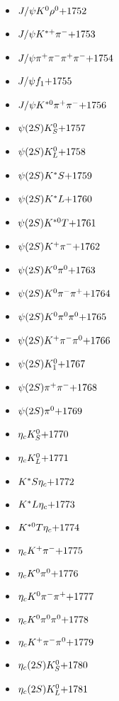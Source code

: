 \begin{multicols}{3}
\begin{itemize}
 \item $ J/\psi K^{0} \rho^{0} \hfill{+1752}$
 \item $ J/\psi K^{*+} \pi^{-} \hfill{+1753}$
 \item $ J/\psi \pi^{+} \pi^{-} \pi^{+} \pi^{-} \hfill{+1754}$
 \item $ J/\psi f_{1} \hfill{+1755}$
 \item $ J/\psi K^{*0} \pi^{+} \pi^{-} \hfill{+1756}$
 \item $ \psi(2S) K_{S}^{0} \hfill{+1757}$
 \item $ \psi(2S) K_{L}^{0} \hfill{+1758}$
 \item $ \psi(2S) K^{*}S \hfill{+1759}$
 \item $ \psi(2S) K^{*}L \hfill{+1760}$
 \item $ \psi(2S) K^{*0}T \hfill{+1761}$
 \item $ \psi(2S) K^{+} \pi^{-} \hfill{+1762}$
 \item $ \psi(2S) K^{0} \pi^{0} \hfill{+1763}$
 \item $ \psi(2S) K^{0} \pi^{-} \pi^{+} \hfill{+1764}$
 \item $ \psi(2S) K^{0} \pi^{0} \pi^{0} \hfill{+1765}$
 \item $ \psi(2S) K^{+} \pi^{-} \pi^{0} \hfill{+1766}$
 \item $ \psi(2S) K_{1}^{0} \hfill{+1767}$
 \item $ \psi(2S) \pi^{+} \pi^{-} \hfill{+1768}$
 \item $ \psi(2S) \pi^{0} \hfill{+1769}$
 \item $ \eta_{c} K_{S}^{0} \hfill{+1770}$
 \item $ \eta_{c} K_{L}^{0} \hfill{+1771}$
 \item $ K^{*}S \eta_{c} \hfill{+1772}$
 \item $ K^{*}L \eta_{c} \hfill{+1773}$
 \item $ K^{*0}T \eta_{c} \hfill{+1774}$
 \item $ \eta_{c} K^{+} \pi^{-} \hfill{+1775}$
 \item $ \eta_{c} K^{0} \pi^{0} \hfill{+1776}$
 \item $ \eta_{c} K^{0} \pi^{-} \pi^{+} \hfill{+1777}$
 \item $ \eta_{c} K^{0} \pi^{0} \pi^{0} \hfill{+1778}$
 \item $ \eta_{c} K^{+} \pi^{-} \pi^{0} \hfill{+1779}$
 \item $ \eta_{c}(2S) K_{S}^{0} \hfill{+1780}$
 \item $ \eta_{c}(2S) K_{L}^{0} \hfill{+1781}$

\end{itemize}
\end{multicols}
